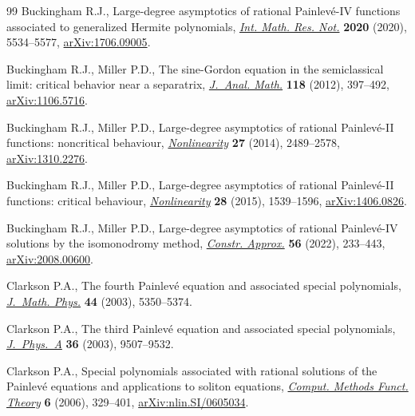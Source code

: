 \documentclass[10pt,a4paper]{amsart}
\numberwithin{equation}{section}
\theoremstyle{definition}
\begin{document}
\begin{thebibliography}{99}
Buckingham R.J., Large-degree asymptotics of rational {P}ainlev\'e-{IV}
 functions associated to generalized {H}ermite polynomials,
 \href{https://doi.org/10.1093/imrn/rny172}{\textit{Int. Math. Res. Not.}}
 \textbf{2020} (2020), 5534--5577,
 \href{http://arxiv.org/abs/1706.09005}{arXiv:1706.09005}.

Buckingham R.J., Miller P.D., The sine-{G}ordon equation in the semiclassical
 limit: critical behavior near a separatrix,
 \href{https://doi.org/10.1007/s11854-012-0041-3}{\textit{J.~Anal. Math.}}
 \textbf{118} (2012), 397--492,
 \href{http://arxiv.org/abs/1106.5716}{arXiv:1106.5716}.

Buckingham R.J., Miller P.D., Large-degree asymptotics of rational
 {P}ainlev\'e-{II} functions: noncritical behaviour,
 \href{https://doi.org/10.1088/0951-7715/27/10/2489}{\textit{Nonlinearity}}
 \textbf{27} (2014), 2489--2578,
 \href{http://arxiv.org/abs/1310.2276}{arXiv:1310.2276}.

Buckingham R.J., Miller P.D., Large-degree asymptotics of rational
 {P}ainlev\'e-{II} functions: critical behaviour,
 \href{https://doi.org/10.1088/0951-7715/28/6/1539}{\textit{Nonlinearity}}
 \textbf{28} (2015), 1539--1596,
 \href{http://arxiv.org/abs/1406.0826}{arXiv:1406.0826}.

Buckingham R.J., Miller P.D., Large-degree asymptotics of rational
 {P}ainlev\'e-{IV} solutions by the isomonodromy method,
 \href{https://doi.org/10.1007/s00365-022-09586-1}{\textit{Constr. Approx.}}
 \textbf{56} (2022), 233--443,
 \href{http://arxiv.org/abs/2008.00600}{arXiv:2008.00600}.

Clarkson P.A., The fourth {P}ainlev\'e equation and associated special
 polynomials, \href{https://doi.org/10.1063/1.1603958}{\textit{J.~Math.
 Phys.}} \textbf{44} (2003), 5350--5374.

Clarkson P.A., The third {P}ainlev\'e equation and associated special
 polynomials,
 \href{https://doi.org/10.1088/0305-4470/36/36/306}{\textit{J.~Phys.~A}}
 \textbf{36} (2003), 9507--9532.

Clarkson P.A., Special polynomials associated with rational solutions of the
 {P}ainlev\'e equations and applications to soliton equations,
 \href{https://doi.org/10.1007/BF03321618}{\textit{Comput. Methods Funct.
 Theory}} \textbf{6} (2006), 329--401,
 \href{http://arxiv.org/abs/nlin.SI/0605034}{arXiv:nlin.SI/0605034}.


\end{thebibliography}
\end{document}
